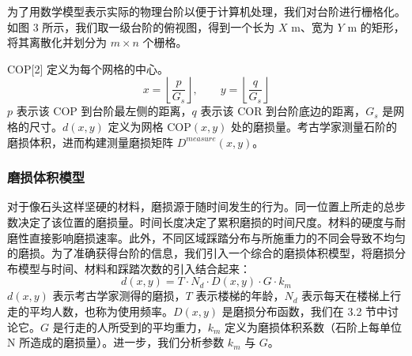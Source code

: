 \documentclass[11pt,a4paper]{ctexart}
\begin{document}
为了用数学模型表示实际的物理台阶以便于计算机处理，我们对台阶进行栅格化。如图 3 所示，我们取一级台阶的俯视图，得到一个长为 \(X\) m、宽为 \(Y\) m 的矩形，将其离散化并划分为 \(m\times n\) 个栅格。

COP[2] 定义为每个网格的中心。
\begin{equation}
x=\left\lfloor\frac{p}{G_s}\right\rfloor,\qquad y=\left\lfloor\frac{q}{G_s}\right\rfloor \tag{3.1}
\end{equation}
\(p\) 表示该 COP 到台阶最左侧的距离，\(q\) 表示该 COR 到台阶底边的距离，\(G_s\) 是网格的尺寸。\(d(x,y)\) 定义为网格 COP\((x,y)\) 处的磨损量。考古学家测量石阶的磨损体积，进而构建测量磨损矩阵 \(D^{measure}(x,y)\)。

\subsubsection{磨损体积模型}

对于像石头这样坚硬的材料，磨损源于随时间发生的行为。同一位置上所走的总步数决定了该位置的磨损量。时间长度决定了累积磨损的时间尺度。材料的硬度与耐磨性直接影响磨损速率。此外，不同区域踩踏分布与所施重力的不同会导致不均匀的磨损。为了准确获得台阶的信息，我们引入一个综合的磨损体积模型，将磨损分布模型与时间、材料和踩踏次数的引入结合起来：
\begin{equation}
d(x,y)=T\cdot N_d\cdot D(x,y)\cdot G\cdot k_m \tag{3.2}
\end{equation}
\(d(x,y)\) 表示考古学家测得的磨损，\(T\) 表示楼梯的年龄，\(N_d\) 表示每天在楼梯上行走的平均人数，也称为使用频率。\(D(x,y)\) 是磨损分布函数，我们在 3.2 节中讨论它。\(G\) 是行走的人所受到的平均重力，\(k_m\) 定义为磨损体积系数（石阶上每单位 N 所造成的磨损量）。进一步，我们分析参数 \(k_m\) 与 \(G\)。
\end{document}
